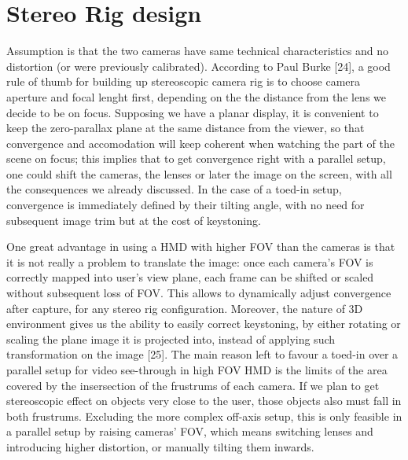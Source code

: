 \section{Stereo Rig design}
Assumption is that the two cameras have same technical characteristics and no distortion (or were previously calibrated). According to Paul Burke [24], a good rule of thumb for building up stereoscopic camera rig is to choose camera aperture and focal lenght first, depending on the the distance from the lens we decide to be on focus. Supposing we have a planar display, it is convenient to keep the zero-parallax plane at the same distance from the viewer, so that convergence and accomodation will keep coherent when watching the part of the scene on focus; this implies that to get convergence right with a parallel setup, one could shift the cameras, the lenses or later the image on the screen, with all the consequences we already discussed. In the case of a toed-in setup, convergence is immediately defined by their tilting angle, with no need for subsequent image trim but at the cost of keystoning.

One great advantage in using a HMD with higher FOV than the cameras is that it is not really a problem to translate the image: once each camera's FOV is correctly mapped into user's view plane, each frame can be shifted or scaled without subsequent loss of FOV. This allows to dynamically adjust convergence after capture, for any stereo rig configuration. Moreover, the nature of 3D environment gives us the ability to easily correct keystoning, by either rotating or scaling the plane image it is projected into, instead of applying such transformation on the image [25]. The main reason left to favour a toed-in over a parallel setup for video see-through in high FOV HMD is the limits of the area covered by the insersection of the frustrums of each camera. If we plan to get stereoscopic effect on objects very close to the user, those objects also must fall in both frustrums. Excluding the more complex off-axis setup, this is only feasible in a parallel setup by raising cameras' FOV, which means switching lenses and introducing higher distortion, or manually tilting them inwards.

